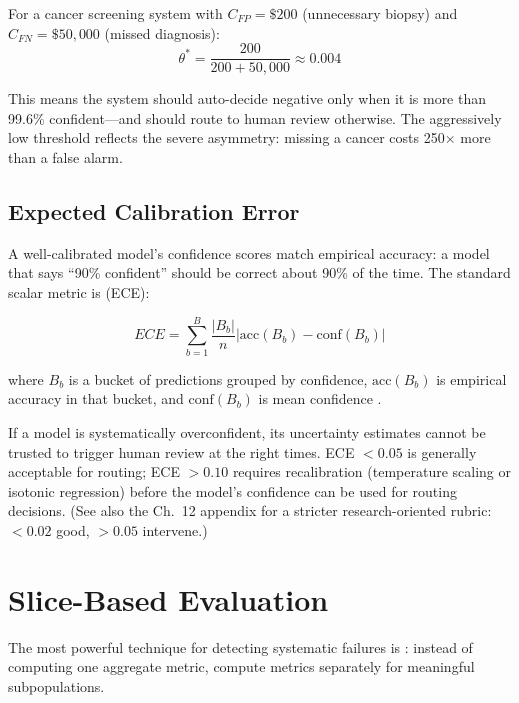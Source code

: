For a cancer screening system with $C_{FP} = \$200$ (unnecessary biopsy) and $C_{FN} = \$50{,}000$ (missed diagnosis):
\[
\theta^* = \frac{200}{200 + 50{,}000} \approx 0.004
\]

This means the system should auto-decide negative only when it is more than 99.6\% confident---and should route to human review otherwise. The aggressively low threshold reflects the severe asymmetry: missing a cancer costs 250$\times$ more than a false alarm.

\subsection{Expected Calibration Error}

A well-calibrated model's confidence scores match empirical accuracy: a model that says ``90\% confident'' should be correct about 90\% of the time. The standard scalar metric is  (ECE):

\begin{equation}
ECE = \sum_{b=1}^{B} \frac{|B_b|}{n} \left| \text{acc}(B_b) - \text{conf}(B_b) \right|
\label{eq:ece-ch15}
\end{equation}

where $B_b$ is a bucket of predictions grouped by confidence, $\text{acc}(B_b)$ is empirical accuracy in that bucket, and $\text{conf}(B_b)$ is mean confidence \autocite{guo2017calibration}.

\begin{technote}
If a model is systematically overconfident, its uncertainty estimates cannot be trusted to trigger human review at the right times. ECE $< 0.05$ is generally acceptable for \hitl routing; ECE $> 0.10$ requires recalibration (temperature scaling or isotonic regression) before the model's confidence can be used for routing decisions. (See also the Ch.~12 appendix for a stricter research-oriented rubric: $<0.02$ good, $>0.05$ intervene.)
\end{technote}

\section{Slice-Based Evaluation}

The most powerful technique for detecting systematic failures is : instead of computing one aggregate metric, compute metrics separately for meaningful subpopulations.

